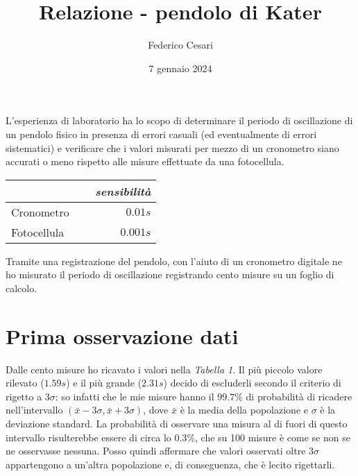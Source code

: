 \documentclass{article}
\title{Relazione - pendolo di Kater}
\author{Federico Cesari}
\date{7 gennaio 2024}
\begin{document}
	\maketitle
	\vspace{3cm}
	
	L'esperienza di laboratorio ha lo scopo di determinare il periodo di oscillazione di un pendolo fisico in presenza di errori casuali (ed eventualmente di errori sistematici) e verificare che i valori misurati per mezzo di un cronometro siano accurati o meno rispetto alle misure effettuate da una fotocellula. 
	
	\vspace{0.5cm}
	\begin{table}[H]
		\centering
		\renewcommand{\arraystretch}{1.5}
		\begin{tabular}{lr}
			 & \textit{sensibilità}\\
			 \hline
			Cronometro $\quad$                	& $0.01s$    \\
			Fotocellula  $\quad$                & $0.001s$    \\
		\end{tabular}
		\renewcommand{\arraystretch}{1}
	\end{table}
	\vspace{0.5cm}
	
	Tramite una registrazione del pendolo, con l'aiuto di un cronometro digitale ne ho misurato il periodo di oscillazione registrando cento misure su un foglio di calcolo. 
	
	
	
	
	
	
	
	
	
	\newpage
	\section{Prima osservazione dati}
	
	Dalle cento misure ho ricavato i valori nella \textit{Tabella 1}. Il più piccolo valore rilevato ($1.59s$) e il più grande ($2.31s$) decido di escluderli secondo il criterio di rigetto a $3\sigma$: so infatti che le mie misure hanno il $99.7 \%$ di probabilità di ricadere nell'intervallo $(\bar{x}  - 3\sigma , \bar{x} + 3\sigma)$, dove $\bar{x}$ è la media della popolazione e $\sigma$ è la deviazione standard. La probabilità di osservare una misura al di fuori di questo intervallo risulterebbe essere di circa lo $0.3\%$, che su 100 misure è come se non  se ne osservasse nessuna. Posso quindi affermare che valori osservati oltre $3 \sigma$ appartengono a un'altra popolazione e, di conseguenza, che è lecito rigettarli. 
	
\end{document}

